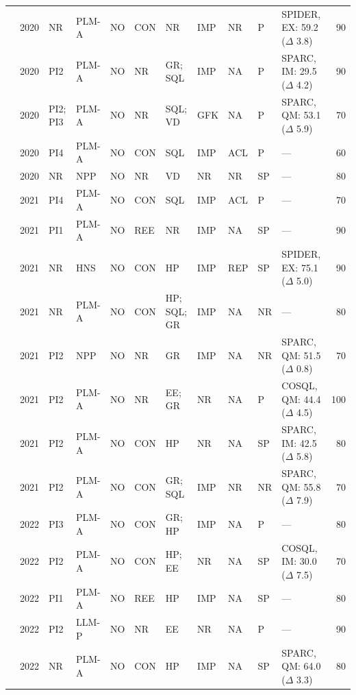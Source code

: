 {\begin{longtable}{@{}l l l l l l l l l l p{4.4cm} r@{}}
\cite{Zhong2020Grounded} & 2020 & NR & PLM-A & NO & CON & NR & IMP & NR & P & SPIDER, EX: 59.2 ($\Delta$ 3.8) & 90 \\
\cite{Cai2020IGSQL} & 2020 & PI2 & PLM-A & NO & NR & GR; SQL & IMP & NA & P & SPARC, IM: 29.5 ($\Delta$ 4.2) & 90 \\
\cite{Wang2020PGGSQL} & 2020 & PI2; PI3 & PLM-A & NO & NR & SQL; VD & GFK & NA & P & SPARC, QM: 53.1 ($\Delta$ 5.9) & 70 \\
\cite{Elgohary2020Speak} & 2020 & PI4 & PLM-A & NO & CON & SQL & IMP & ACL & P & --- & 60 \\
\cite{Yu2019SParC} & 2020 & NR & NPP & NO & NR & VD & NR & NR & SP & --- & 80 \\
\cite{Elgohary2021NLEDIT} & 2021 & PI4 & PLM-A & NO & CON & SQL & IMP & ACL & P & --- & 70 \\
\cite{Chen2021Decoupled} & 2021 & PI1 & PLM-A & NO & REE & NR & IMP & NA & SP & --- & 90 \\
\cite{Scholak2021PICARD} & 2021 & NR & HNS & NO & CON & HP & IMP & REP & SP & SPIDER, EX: 75.1 ($\Delta$ 5.0) & 90 \\
\cite{Guo2021Chase} & 2021 & NR & PLM-A & NO & CON & HP; SQL; GR & IMP & NA & NR & --- & 80 \\
\cite{Yu2021Interactionmodeling} & 2021 & PI2 & NPP & NO & NR & GR & IMP & NA & NR & SPARC, QM: 51.5 ($\Delta$ 0.8) & 70 \\
\cite{Wang2021Tracking} & 2021 & PI2 & PLM-A & NO & NR & EE; GR & NR & NA & P & COSQL, QM: 44.4 ($\Delta$ 4.5) & 100 \\
\cite{Yu2021SCoRe} & 2021 & PI2 & PLM-A & NO & CON & HP & NR & NA & SP & SPARC, IM: 42.5 ($\Delta$ 5.8) & 80 \\
\cite{Hui2021Dynamic} & 2021 & PI2 & PLM-A & NO & CON & GR; SQL & IMP & NR & NR & SPARC, QM: 55.8 ($\Delta$ 7.9) & 70 \\
\cite{Zheng2022HIESQL} & 2022 & PI3 & PLM-A & NO & CON & GR; HP & IMP & NA & P & --- & 80 \\
\cite{Cai2022STAR} & 2022 & PI2 & PLM-A & NO & CON & HP; EE & NR & NA & SP & COSQL, IM: 30.0 ($\Delta$ 7.5) & 70 \\
\cite{Xiao2022CQRSQL} & 2022 & PI1 & PLM-A & NO & REE & HP & IMP & NA & SP & --- & 80 \\
\cite{Hu2022InContext} & 2022 & PI2 & LLM-P & NO & NR & EE & NR & NA & P & --- & 90 \\
\cite{Liu2022Augmenting} & 2022 & NR & PLM-A & NO & CON & HP & IMP & NA & SP & SPARC, QM: 64.0 ($\Delta$ 3.3) & 80 \\

\end{longtable}}
